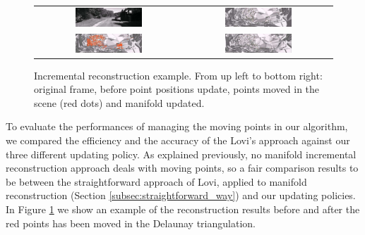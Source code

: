 \begin{figure}[t]
\centering
\begin{tabular}{cc}
\includegraphics[width = 0.47\textwidth]{./img//ExRec_cropped}&
\includegraphics[width = 0.47\textwidth]{./img//ExRec01_cropped}\\
\includegraphics[width = 0.47\textwidth]{./img//ExRec02_cropped}&
\includegraphics[width = 0.47\textwidth]{./img//ExRec05}\\
\end{tabular}
\caption{Incremental reconstruction example. From up left to bottom right: original frame, before point positions update, points moved in the scene (red dots) and  manifold updated.}
\label{fig:exampleFr}
\end{figure}



To evaluate the performances of managing the moving points in our algorithm, we compared the efficiency and the accuracy of the Lovi's approach against our three different updating policy.
As explained previously, no manifold incremental reconstruction approach deals with moving points, so a fair comparison results to be between the straightforward approach of Lovi, applied to manifold reconstruction (Section \ref{subsec:straightforward_way}) and our updating policies. In Figure \ref{fig:exampleFr} we show an example of the reconstruction results before and after the red points has been moved in the Delaunay triangulation.

